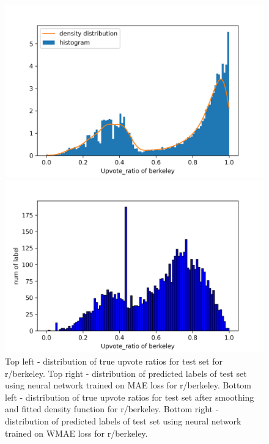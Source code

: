 \documentclass[11pt,a4paper]{article}
\begin{document}
\begin{figure}
        \begin{minipage}{0.5\textwidth}
            \includegraphics[width=\textwidth]{berkeley_task2true_smooth.png}
        \end{minipage}
        \begin{minipage}{0.5\textwidth}
            \includegraphics[width=\textwidth]{berkeley_task2pred_smooth.png}
        \end{minipage}

        \caption{
            Top left - distribution of true upvote ratios for test set for r/berkeley.
            Top right - distribution of predicted labels of test set using neural network trained on MAE loss for r/berkeley.
            Bottom left - distribution of true upvote ratios for test set after smoothing and fitted density function for r/berkeley.
            Bottom right - distribution of predicted labels of test set using neural network trained on WMAE loss for r/berkeley.
        }
    \end{figure}
\end{document}
